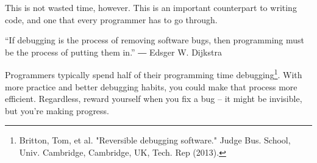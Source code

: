 This is not wasted time, however. This is an important counterpart to writing code, and one that every programmer has to go through.

\begin{mdframed}



“If debugging is the process of removing software bugs, then programming must be the process of putting them in.” ― Edsger W. Dijkstra

\end{mdframed}

Programmers typically spend half of their programming time debugging\footnote{Britton, Tom, et al. "Reversible debugging software." Judge Bus. School, Univ. Cambridge, Cambridge, UK, Tech. Rep (2013).}. With more practice and better debugging habits, you could make that process more efficient. Regardless, reward yourself when you fix a bug -- it might be invisible, but you're making progress.